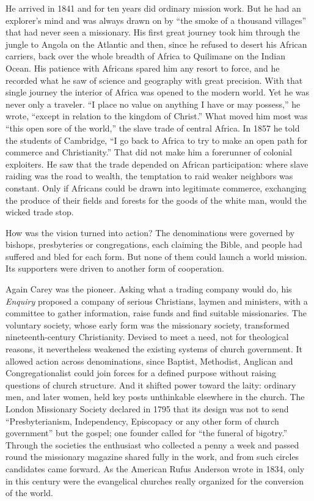 He arrived in 1841 and for ten years did ordinary mission work. But he had an explorer's mind and
was always drawn on by ``the smoke of a thousand villages'' that had never seen a missionary. His
first great journey took him through the jungle to Angola on the Atlantic and then, since he refused to desert his African carriers, back over the whole breadth of Africa to Quilimane on the Indian Ocean. His patience with Africans spared him any resort to force, and he recorded what he saw of science and geography with great precision. With that single journey the interior of Africa was opened to the modern world. Yet he was never only a traveler. ``I place no value on anything I have or may possess,'' he
wrote, ``except in relation to the kingdom of Christ.'' What moved him most was ``this open sore of
the world,'' the slave trade of central Africa. In 1857 he told the students of Cambridge, ``I go
back to Africa to try to make an open path for commerce and Christianity.'' That did not make him a
forerunner of colonial exploiters. He saw that the trade depended on African participation: where
slave raiding was the road to wealth, the temptation to raid weaker neighbors was constant. Only if
Africans could be drawn into legitimate commerce, exchanging the produce of their fields and forests
for the goods of the white man, would the wicked trade stop.

How was the vision turned into action? The denominations were governed by bishops, presbyteries or
congregations, each claiming the Bible, and people had suffered and bled for each form. But none of
them could launch a world mission. Its supporters were driven to another form of cooperation.

Again Carey was the pioneer. Asking what a trading company would do, his \emph{Enquiry} proposed a
company of serious Christians, laymen and ministers, with a committee to gather information, raise
funds and find suitable missionaries. The voluntary society, whose early form was the missionary society, transformed nineteenth-century Christianity. Devised to meet a need, not for theological
reasons, it nevertheless weakened the existing systems of church government. It allowed action across denominations, since Baptist, Methodist, Anglican and Congregationalist could join forces for a defined purpose without raising questions of church structure. And it shifted
power toward the laity: ordinary men, and later women, held key posts unthinkable elsewhere in the
church. The London Missionary Society declared in 1795 that its design was not to send
``Presbyterianism, Independency, Episcopacy or any other form of church government'' but the gospel;
one founder called for ``the funeral of bigotry.'' Through the societies the enthusiast who collected
a penny a week and passed round the missionary magazine shared fully in the work, and from such
circles candidates came forward. As the American Rufus Anderson wrote in 1834, only in this century
were the evangelical churches really organized for the conversion of the world.

